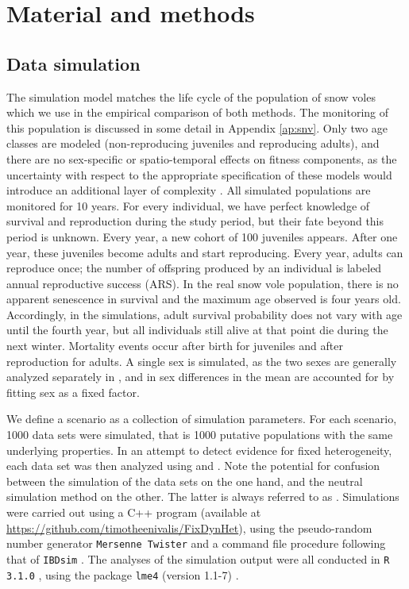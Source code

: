 \section{Material and methods}

\subsection{Data simulation}

The simulation model matches the life cycle of the population of snow voles which we use in the empirical comparison of both methods. The monitoring of this population is discussed in some detail in Appendix \ref{ap:snv}. Only two age classes are modeled (non-reproducing juveniles and reproducing adults), and there are no sex-specific or spatio-temporal effects on fitness components, as the uncertainty with respect to the appropriate specification of these models would introduce an additional layer of complexity \parencite[see e.g.][]{Cam2013}.
All simulated populations are monitored for 10 years. For every individual, we have perfect knowledge of survival and reproduction during the study period, but their fate beyond this period is unknown. Every year, a new cohort of 100 juveniles appears. After one year, these juveniles become adults and start reproducing. Every year, adults can reproduce once; the number of offspring produced by an individual is labeled annual reproductive success (ARS). In the real snow vole population, there is no apparent senescence in survival and the maximum age observed is four years old. Accordingly, in the simulations, adult survival probability does not vary with age until the fourth year, but all individuals still alive at that point die during the next winter. Mortality events occur after birth for juveniles and after reproduction for adults. A single sex is simulated, as the two sexes are generally analyzed separately in \NSM, and in \MM sex differences in the mean are accounted for by fitting sex as a fixed factor.

We define a scenario as a collection of simulation parameters. For each scenario, 1000 data sets were simulated, that is 1000 putative populations with the same underlying properties. In an attempt to detect evidence for fixed heterogeneity, each data set was then analyzed using \MM and \NSM. Note the potential for confusion between the simulation of the data sets on the one hand, and the neutral simulation method on the other. The latter is always referred to as \NSM. Simulations were carried out using a C++ program (available at \url{https://github.com/timotheenivalis/FixDynHet}), using the pseudo-random number generator \verb+Mersenne Twister+ \parencite{Matsumoto1998} and a command file procedure following that of \verb+IBDsim+ \parencite{Leblois2009}. The analyses of the simulation output were all conducted in \verb+R 3.1.0+ \parencite{R2014}, using the package \verb+lme4+ (version 1.1-7) \parencite{Bates2014a}.

